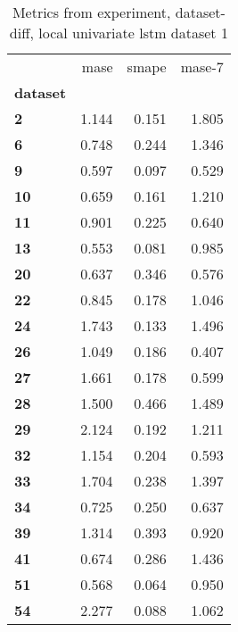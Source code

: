 \begin{table}[h]
\centering
\caption{Metrics from experiment, dataset-diff, local univariate lstm dataset 1}
\label{table:local-univariate-lstm-dataset-1-dataset-diff}
\begin{tabular}{lrrr}
\toprule
{} &   mase &  smape &  mase-7 \\
\textbf{dataset} &        &        &         \\
\midrule
\textbf{2      } &  1.144 &  0.151 &   1.805 \\
\textbf{6      } &  0.748 &  0.244 &   1.346 \\
\textbf{9      } &  0.597 &  0.097 &   0.529 \\
\textbf{10     } &  0.659 &  0.161 &   1.210 \\
\textbf{11     } &  0.901 &  0.225 &   0.640 \\
\textbf{13     } &  0.553 &  0.081 &   0.985 \\
\textbf{20     } &  0.637 &  0.346 &   0.576 \\
\textbf{22     } &  0.845 &  0.178 &   1.046 \\
\textbf{24     } &  1.743 &  0.133 &   1.496 \\
\textbf{26     } &  1.049 &  0.186 &   0.407 \\
\textbf{27     } &  1.661 &  0.178 &   0.599 \\
\textbf{28     } &  1.500 &  0.466 &   1.489 \\
\textbf{29     } &  2.124 &  0.192 &   1.211 \\
\textbf{32     } &  1.154 &  0.204 &   0.593 \\
\textbf{33     } &  1.704 &  0.238 &   1.397 \\
\textbf{34     } &  0.725 &  0.250 &   0.637 \\
\textbf{39     } &  1.314 &  0.393 &   0.920 \\
\textbf{41     } &  0.674 &  0.286 &   1.436 \\
\textbf{51     } &  0.568 &  0.064 &   0.950 \\
\textbf{54     } &  2.277 &  0.088 &   1.062 \\
\bottomrule
\end{tabular}
\end{table}
